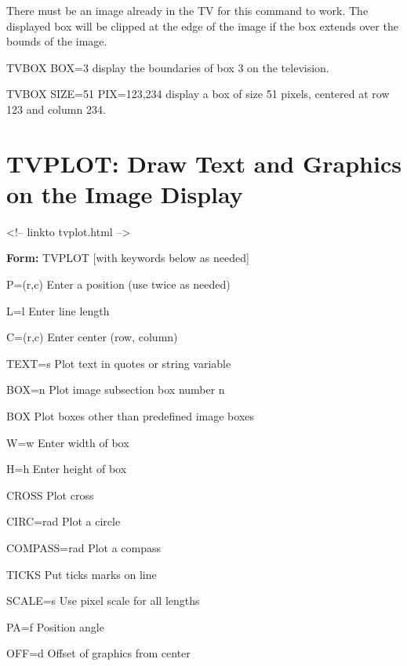 There must be an image already in the TV for this command to work. The
displayed box will be clipped at the edge of the image if the box extends
over the bounds of the image.

\begin{example}
  \item[TVBOX BOX=3\hfill]{display the boundaries of box 3
       on the television.}
  \item[TVBOX SIZE=51 PIX=123,234\hfill]{display a box of size 51
       pixels, centered at row 123 and column 234.}
\end{example}

\section{TVPLOT: Draw Text and Graphics on the Image Display}
\begin{rawhtml}
<!-- linkto tvplot.html -->
\end{rawhtml}
\begin{command}
  \item[\textbf{Form: }TVPLOT {[with keywords below as needed]}\hfill]{}
  \item[P=(r,c)]{         Enter a position (use twice as needed)}
  \item[L=l]{             Enter line length}
  \item[C=(r,c)]{         Enter center (row, column)}
  \item[TEXT=s]{          Plot text in quotes or string variable}
  \item[BOX=n]{           Plot image subsection box number n}
  \item[BOX]{             Plot boxes other than predefined image boxes}
  \item[W=w]{             Enter width of box}
  \item[H=h]{             Enter height of box}
  \item[CROSS]{           Plot cross}
  \item[CIRC=rad]{        Plot a circle}
  \item[COMPASS=rad]{     Plot a compass}
  \item[TICKS]{           Put ticks marks on line}
  \item[SCALE=s]{         Use pixel scale for all lengths}
  \item[PA=f]{            Position angle}
  \item[OFF=d]{           Offset of graphics from center}
\end{command}

